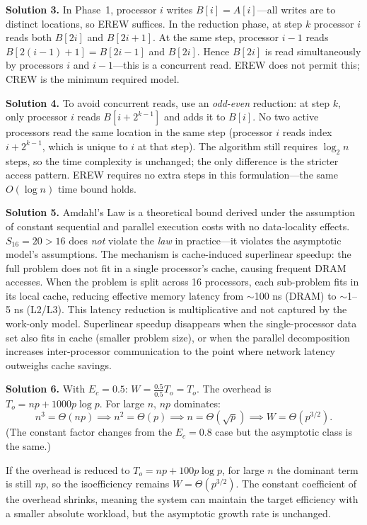 \medskip
\textbf{Solution 3.}
In Phase~1, processor $i$ writes $B[i] = A[i]$---all writes are to distinct
locations, so EREW suffices. In the reduction phase, at step $k$ processor $i$
reads both $B[2i]$ and $B[2i+1]$. At the same step, processor $i-1$ reads
$B[2(i-1)+1] = B[2i-1]$ and $B[2i]$. Hence $B[2i]$ is read simultaneously by
processors $i$ and $i-1$---this is a concurrent read. EREW does not permit
this; CREW is the minimum required model.

\medskip
\textbf{Solution 4.}
To avoid concurrent reads, use an \emph{odd-even} reduction: at step $k$,
only processor $i$ reads $B[i + 2^{k-1}]$ and adds it to $B[i]$. No two
active processors read the same location in the same step (processor $i$ reads
index $i + 2^{k-1}$, which is unique to $i$ at that step). The algorithm
still requires $\log_2 n$ steps, so the time complexity is unchanged;
the only difference is the stricter access pattern. EREW requires no extra
steps in this formulation---the same $O(\log n)$ time bound holds.

\medskip
\textbf{Solution 5.}
Amdahl's Law is a theoretical bound derived under the assumption of constant
sequential and parallel execution costs with no data-locality effects.
$S_{16} = 20 > 16$ does \emph{not} violate the \emph{law} in practice---it
violates the asymptotic model's assumptions. The mechanism is cache-induced
superlinear speedup: the full problem does not fit in a single processor's
cache, causing frequent DRAM accesses. When the problem is split across 16
processors, each sub-problem fits in its local cache, reducing effective memory
latency from $\sim$100 ns (DRAM) to $\sim$1--5 ns (L2/L3). This latency
reduction is multiplicative and not captured by the work-only model.
Superlinear speedup disappears when the single-processor data set also fits in
cache (smaller problem size), or when the parallel decomposition increases
inter-processor communication to the point where network latency outweighs
cache savings.

\medskip
\textbf{Solution 6.}
With $E_c = 0.5$: $W = \frac{0.5}{0.5} T_o = T_o$.
The overhead is $T_o = np + 1000p \log p$. For large $n$, $np$ dominates:
\[
  n^3 = \Theta(np) \implies n^2 = \Theta(p) \implies n = \Theta(\sqrt{p})
  \implies W = \Theta(p^{3/2}).
\]
(The constant factor changes from the $E_c = 0.8$ case but the asymptotic
class is the same.)

If the overhead is reduced to $T_o = np + 100p \log p$, for large $n$ the
dominant term is still $np$, so the isoefficiency remains $W = \Theta(p^{3/2})$.
The constant coefficient of the overhead shrinks, meaning the system can
maintain the target efficiency with a smaller absolute workload, but the
asymptotic growth rate is unchanged.

